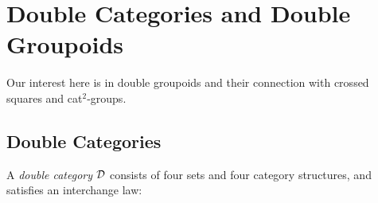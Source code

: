 
\section{Double Categories and Double Groupoids} \label{sect:dblgpd}

Our interest here is in double groupoids and their connection with 
crossed squares and cat$^2$-groups.

\subsection{Double Categories} \label{subs:dblcat}

A \emph{double category} $\mathcal{D}$ consists of four sets and 
four category structures, and satisfies an interchange law:
